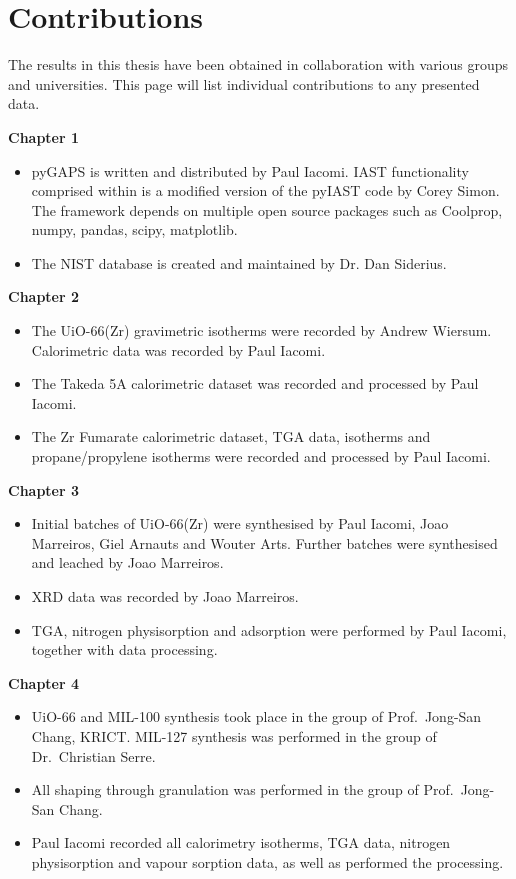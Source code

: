 
\chapter{Contributions}

The results in this thesis have been obtained in collaboration
with various groups and universities. This page will list 
individual contributions to any presented data.

{
\textbf{Chapter 1}
\begin{itemize}
    \small
    \item pyGAPS is written and distributed by Paul Iacomi. IAST 
    functionality comprised within is a modified version of the pyIAST 
    code by Corey Simon. The framework depends on multiple open source
    packages such as Coolprop, numpy, pandas, scipy, matplotlib.
    \item The NIST database is created and maintained by Dr. Dan Siderius.
\end{itemize}

\textbf{Chapter 2}
\begin{itemize}
    \small
    \item The UiO-66(Zr) gravimetric isotherms were recorded by 
    Andrew Wiersum. Calorimetric data was recorded by Paul Iacomi.
    \item The Takeda 5A calorimetric dataset was recorded and processed by Paul Iacomi.
    \item The Zr Fumarate calorimetric dataset, TGA data,  isotherms and propane/propylene isotherms were recorded and 
    processed by Paul Iacomi. 
\end{itemize}

\textbf{Chapter 3}
\begin{itemize}
    \small
    \item Initial batches of UiO-66(Zr) were synthesised by Paul Iacomi, Joao Marreiros, Giel Arnauts and Wouter Arts. Further batches were
    synthesised and leached by Joao Marreiros.
    \item XRD data was recorded by Joao Marreiros.
    \item TGA, nitrogen physisorption and  adsorption were performed by Paul Iacomi, together with data processing.
\end{itemize}

\textbf{Chapter 4}
\begin{itemize}
    \small
    \item UiO-66 and MIL-100 synthesis took place in the group of Prof.\ Jong-San Chang, KRICT. MIL-127 synthesis was performed in the group
    of Dr.\ Christian Serre.
    \item All shaping through granulation was performed in the group of
    Prof.\ Jong-San Chang.
    \item Paul Iacomi recorded all calorimetry isotherms, TGA data,
    nitrogen physisorption and vapour sorption data, as well as 
    performed the processing. 
\end{itemize}

}
